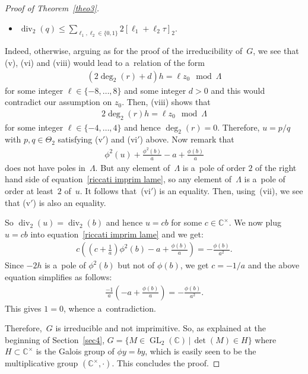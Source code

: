\documentclass[10pt,a4paper]{amsart}
\numberwithin{equation}{section}
\newcommand{\divi}[1]{\operatorname{div}_{#1}}
\newcommand{\degr}[1]{\deg_{#1}}
\newcommand{\prodtheta}[1]{\Theta_{#1}}
\begin{document}
\begin{proof}[Proof of Theorem~\ref{theo3}]
\begin{itemize}
\item[(vi$'$)] $\divi{2} (q) \leq \sum\limits_{\ell_{1},\ell_{2} \in \{0,1\}}2[\ell_{1}+\ell_{2}\tau]_{2}$.
\end{itemize}
Indeed, otherwise, arguing as for the proof of the irreducibility of~$G$, we see that (v), (vi) and (viii) would lead to
a~relation of the form
\begin{gather*}
(2\degr{2} (r) + d)h = \ell z_{0} \mod \Lambda
\end{gather*}
for some integer $\ell \in \{-8,\dots,8\}$ and some integer $d>0$ and this would contradict our assumption on $z_{0}$.
Then, (viii) shows that
\begin{gather*}
2\degr{2} (r) h = \ell z_{0} \mod \Lambda
\end{gather*}
for some integer $\ell \in \{-4,\dots,4\}$ and hence $\degr{2} (r)=0$.
Therefore, $u=p/q$ with $p,q \in \prodtheta{2}$ satisfying (v$'$) and (vi$'$) above.
Now remark that
\begin{gather*}
\phi^{2}(u)+\frac{\phi^{2}(b)}{a}-a+\frac{\phi(b)}{a}
\end{gather*}
does not have poles in~$\Lambda$.
But any element of~$\Lambda$ is a~pole of order $2$ of the right hand side of equation~\eqref{riccati imprim lame}, so
any element of~$\Lambda$ is a~pole of order at least~$2$ of~$u$.
It follows that~(vi$'$) is an equality.
Then, using~(vii), we see that (v$'$) is also an equality.

So $\divi{2}(u)=\divi{2}(b)$ and hence $u=cb$ for some $c \in \mathbb C^{\times}$.
We now plug $u=cb$ into equation~\eqref{riccati imprim lame} and we get:
\begin{gather*}
c\left(\left(c+\frac{1}{a}\right)\phi^{2}(b)-a+\frac{\phi(b)}{a} \right)=-\frac{\phi(b)}{a^{2}}.
\end{gather*}
Since $-2h$ is a~pole of $\phi^{2}(b)$ but not of $\phi(b)$, we get $c=-1/a$ and the above equation simplif\/ies as
follows:
\begin{gather*}
\frac{-1}{a}\left(-a+\frac{\phi(b)}{a} \right)=-\frac{\phi(b)}{a^{2}}.
\end{gather*}
This gives $1=0$, whence a~contradiction.

Therefore,~$G$ is irreducible and not imprimitive.
So, as explained at the beginning of Section~\ref{sec4}, $G = \{M \in \operatorname{GL}_{2}(\mathbb C) \, \vert \, \det
(M) \in H\}$ where~$H \subset \mathbb C^{\times}$ is the Galois group of $\phi y = b y$, which is easily seen to be the
multiplicative group $(\mathbb C^{\times},\cdot)$.
This concludes the proof.
\end{proof}
\end{document}
